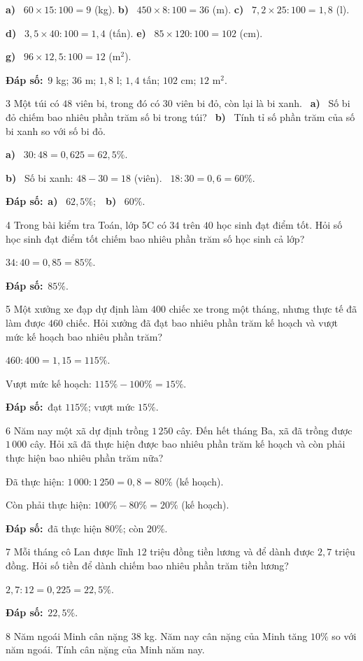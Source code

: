 \documentclass[11pt]{article}
\newif\ifsol \solfalse
\providecommand{\AnsWord}{Đáp số}
\newcommand{\dapso}[1]{\par\textbf{\AnsWord:}\ #1}
\newcommand{\probsol}[1]{%
  \begin{lrbox}{\solmeasure}\begin{minipage}{\dimexpr\linewidth-24pt\relax}#1\end{minipage}\end{lrbox}%
  \ifsol
    \begin{solbox}#1\end{solbox}%
  \else
    \setlength{\solht}{\dimexpr\ht\solmeasure+\dp\solmeasure+0.85cm\relax}%
    \ifdim\solht<1.35cm\setlength{\solht}{1.35cm}\fi
    \begin{tcolorbox}[colback=white,colframe=Line,boxrule=0.8pt,arc=5pt,
      left=8pt,right=8pt,top=4pt,bottom=4pt,height=\solht]{\footnotesize\color{Slate}\itshape\WorkWord}\end{tcolorbox}%
  \fi}
\newcommand{\pa}[1]{\textbf{#1)}\ }
\newcommand{\gap}{\vspace{0.3cm}}
\def\WorkWord{Bài làm:}
\def\AnsWord{Đáp số}
\begin{document}
\probsol{
\pa{a} $60\times15:100=9$ (kg). \quad \pa{b} $450\times8:100=36$ (m). \quad \pa{c} $7{,}2\times25:100=1{,}8$ (l).\par
\pa{d} $3{,}5\times40:100=1{,}4$ (tấn). \quad \pa{e} $85\times120:100=102$ (cm).\par
\pa{g} $96\times12{,}5:100=12$ (m$^2$).
\dapso{$9$ kg; $36$ m; $1{,}8$ l; $1{,}4$ tấn; $102$ cm; $12$ m$^2$.}}
\gap
\begin{probbox}{3}{\relax}
Một túi có $48$ viên bi, trong đó có $30$ viên bi đỏ, còn lại là bi xanh. \ \pa{a} Số bi đỏ chiếm bao nhiêu phần trăm số bi trong túi? \ \pa{b} Tính tỉ số phần trăm của số bi xanh so với số bi đỏ.
\end{probbox}
\probsol{
\pa{a} $30:48=0{,}625=62{,}5\%$.\par
\pa{b} Số bi xanh: $48-30=18$ (viên). \ $18:30=0{,}6=60\%$.
\dapso{\pa{a} $62{,}5\%$;\ \ \pa{b} $60\%$.}}
\gap
\begin{probbox}{4}{\relax}
Trong bài kiểm tra Toán, lớp 5C có $34$ trên $40$ học sinh đạt điểm tốt. Hỏi số học sinh đạt điểm tốt chiếm bao nhiêu phần trăm số học sinh cả lớp?
\end{probbox}
\probsol{
$34:40=0{,}85=85\%$.
\dapso{$85\%$.}}
\gap
\begin{probbox}{5}{\relax}
Một xưởng xe đạp dự định làm $400$ chiếc xe trong một tháng, nhưng thực tế đã làm được $460$ chiếc. Hỏi xưởng đã đạt bao nhiêu phần trăm kế hoạch và vượt mức kế hoạch bao nhiêu phần trăm?
\end{probbox}
\probsol{
$460:400=1{,}15=115\%$.\par
Vượt mức kế hoạch: $115\%-100\%=15\%$.
\dapso{đạt $115\%$; vượt mức $15\%$.}}
\gap
\begin{probbox}{6}{\relax}
Năm nay một xã dự định trồng $1\,250$ cây. Đến hết tháng Ba, xã đã trồng được $1\,000$ cây. Hỏi xã đã thực hiện được bao nhiêu phần trăm kế hoạch và còn phải thực hiện bao nhiêu phần trăm nữa?
\end{probbox}
\probsol{
Đã thực hiện: $1\,000:1\,250=0{,}8=80\%$ (kế hoạch).\par
Còn phải thực hiện: $100\%-80\%=20\%$ (kế hoạch).
\dapso{đã thực hiện $80\%$; còn $20\%$.}}
\gap
\begin{probbox}{7}{\relax}
Mỗi tháng cô Lan được lĩnh $12$ triệu đồng tiền lương và để dành được $2{,}7$ triệu đồng. Hỏi số tiền để dành chiếm bao nhiêu phần trăm tiền lương?
\end{probbox}
\probsol{
$2{,}7:12=0{,}225=22{,}5\%$.
\dapso{$22{,}5\%$.}}
\gap
\begin{probbox}{8}{\relax}
Năm ngoái Minh cân nặng $38$ kg. Năm nay cân nặng của Minh tăng $10\%$ so với năm ngoái. Tính cân nặng của Minh năm nay.
\end{probbox}
\end{document}
